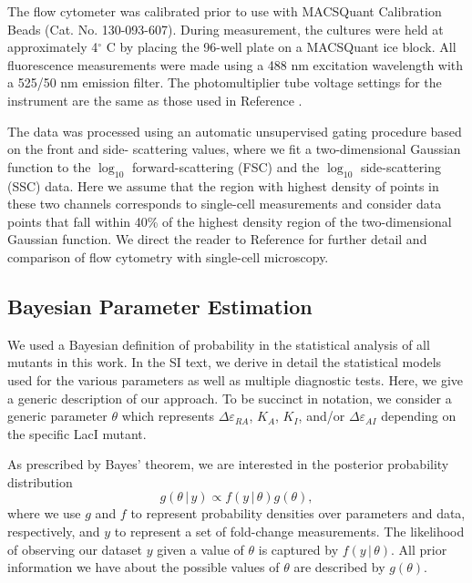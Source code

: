 The flow cytometer was calibrated prior to use with MACSQuant Calibration
Beads (Cat. No. 130-093-607). During measurement, the cultures were held at
approximately 4$^\circ$ C by placing the 96-well plate on a MACSQuant ice block.
All fluorescence measurements were made using a 488 nm excitation wavelength
with a 525/50 nm emission filter. The photomultiplier tube voltage settings for
the instrument are the same as those used in Reference \cite{Razo-Mejia2018}.

The data was processed using an automatic unsupervised gating procedure based
on the front and side- scattering values, where we fit a two-dimensional
Gaussian function to the $\log_{10}$ forward-scattering (FSC) and the
$\log_{10}$ side-scattering (SSC) data. Here we assume that the region with
highest density of points in these two channels corresponds to single-cell
measurements and consider data points that fall within 40\% of the highest
density region of the two-dimensional Gaussian function. We direct the reader
to Reference \cite{Razo-Mejia2018} for further detail and comparison of flow
cytometry with single-cell microscopy.

\subsection{Bayesian Parameter Estimation}
We used a Bayesian definition of probability in the statistical analysis of
all mutants in this work. In the SI text, we derive
in detail the statistical models used for the various parameters as well as
multiple diagnostic tests. Here, we give a generic description of our
approach. To be succinct in notation, we consider a generic parameter
$\theta$ which represents $\Delta\varepsilon_{RA}$, $K_A$, $K_I$, and/or
$\Delta\varepsilon_{AI}$ depending on the specific LacI mutant.

As prescribed by
Bayes' theorem, we are interested in the posterior probability distribution
\begin{equation}
    g(\theta\,\vert\, y) \propto {f(y\,\vert\,\theta)g(\theta)},
    \label{eq:bayes_generic}
\end{equation}
where we use $g$ and $f$ to represent probability densities over parameters and
data, respectively, and $y$ to represent a set of fold-change measurements. The
likelihood of observing our dataset $y$ given a value of $\theta$ is captured by
$f(y\,\vert\,\theta)$. All prior information we have about the possible values
of $\theta$ are described by $g(\theta)$. 

